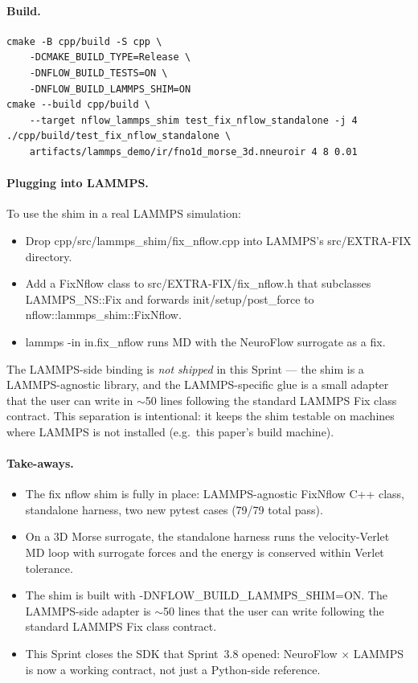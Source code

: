 \documentclass[10pt,twocolumn]{article}
\renewcommand{\texttt}[1]{{\normalfont\ttfamily #1}\normalfont\rmfamily}
\begin{document}
\paragraph{Build.}
\begin{verbatim}
cmake -B cpp/build -S cpp \
    -DCMAKE_BUILD_TYPE=Release \
    -DNFLOW_BUILD_TESTS=ON \
    -DNFLOW_BUILD_LAMMPS_SHIM=ON
cmake --build cpp/build \
    --target nflow_lammps_shim test_fix_nflow_standalone -j 4
./cpp/build/test_fix_nflow_standalone \
    artifacts/lammps_demo/ir/fno1d_morse_3d.nneuroir 4 8 0.01
\end{verbatim}

\paragraph{Plugging into LAMMPS.}
To use the shim in a real LAMMPS simulation:

\begin{itemize}
\item Drop \texttt{cpp/src/lammps\_shim/fix\_nflow.cpp}
into LAMMPS's \texttt{src/EXTRA-FIX} directory.
\item Add a \texttt{FixNflow} class to
\texttt{src/EXTRA-FIX/fix\_nflow.h} that subclasses
\texttt{LAMMPS\_NS::Fix} and forwards
\texttt{init/setup/post\_force} to
\texttt{nflow::lammps\_shim::FixNflow}.
\item \texttt{lammps -in in.fix\_nflow} runs MD with the
NeuroFlow surrogate as a \texttt{fix}.

\end{itemize}

The LAMMPS-side binding is \emph{not shipped} in
this Sprint --- the shim is a LAMMPS-agnostic
library, and the LAMMPS-specific glue is a small
adapter that the user can write in $\sim$50 lines
following the standard LAMMPS \texttt{Fix} class
contract.  This separation is intentional: it
keeps the shim testable on machines where LAMMPS is
not installed (e.g.\ this paper's build machine).

\paragraph{Take-aways.}
\begin{itemize}
\item The \texttt{fix nflow} shim is fully in place:
LAMMPS-agnostic \texttt{FixNflow} C{++} class,
standalone harness, two new pytest cases
(79/79 total pass).
\item On a 3D Morse surrogate, the standalone harness
runs the velocity-Verlet MD loop with surrogate
forces and the energy is conserved within Verlet
tolerance.
\item The shim is built with
\texttt{-DNFLOW\_BUILD\_LAMMPS\_SHIM=ON}.  The
LAMMPS-side adapter is $\sim$50 lines that the
user can write following the standard LAMMPS
\texttt{Fix} class contract.
\item This Sprint closes the SDK that Sprint~3.8
opened: NeuroFlow $\times$ LAMMPS is now a working
contract, not just a Python-side reference.
\end{itemize}
\end{document}
